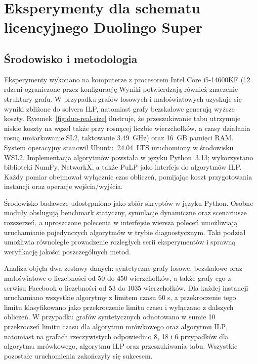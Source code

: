 \chapter{Eksperymenty dla schematu licencyjnego Duolingo Super}
\label{chap:experiments}
\section{Środowisko i metodologia}

Eksperymenty wykonano na komputerze z procesorem Intel Core i5-14600KF (12 rdzeni ograniczone przez konfigurację Wyniki potwierdzają również znaczenie struktury grafu. W przypadku grafów losowych i małoświatowych uzyskuje się wyniki zbliżone do solvera ILP, natomiast grafy bezskalowe generują wyższe koszty. Rysunek~\ref{fig:duo-real-size} ilustruje, że przeszukiwanie tabu utrzymuje niskie koszty na węzeł także przy rosnącej liczbie wierzchołków, a czasy działania rosną umiarkowanie.SL2, taktowanie 3.49~GHz) oraz 16~GB pamięci RAM. System operacyjny stanowił Ubuntu~24.04~LTS uruchomiony w środowisku WSL2. Implementacja algorytmów powstała w języku Python~3.13; wykorzystano biblioteki NumPy, NetworkX, a także PuLP jako interfejs do algorytmów ILP. Każdy pomiar obejmował wyłącznie czas obliczeń, pomijając koszt przygotowania instancji oraz operacje wejścia/wyjścia.

Środowisko badawcze udostępniono jako zbiór skryptów w języku Python. Osobne moduły obsługują benchmark statyczny, symulacje dynamiczne oraz scenariusze rozszerzeń, a uproszczone polecenia w interfejsie wiersza poleceń umożliwiają uruchamianie pojedynczych algorytmów w trybie diagnostycznym. Taki podział umożliwia równoległe prowadzenie rozległych serii eksperymentów i sprawną weryfikację jakości poszczególnych metod.

Analiza objęła dwa zestawy danych: syntetyczne grafy losowe, bezskalowe oraz małoświatowe o liczebności od 50 do 450 wierzchołków, a także grafy ego z serwisu Facebook o liczebności od 53 do 1035 wierzchołków. Dla każdej instancji uruchamiano wszystkie algorytmy z limitem czasu 60 s, a przekroczenie tego limitu klasyfikowano jako przekroczenie limitu czasu i wyłączano z dalszych obliczeń. W przypadku grafów syntetycznych odnotowano w sumie 10 przekroczeń limitu czasu dla algorytmu mrówkowego oraz algorytmu ILP, natomiast na grafach rzeczywistych odpowiednio 8, 18 i 6 przypadków dla algorytmu mrówkowego, algorytmu ILP oraz przeszukiwania tabu. Wszystkie pozostałe uruchomienia zakończyły się sukcesem.

